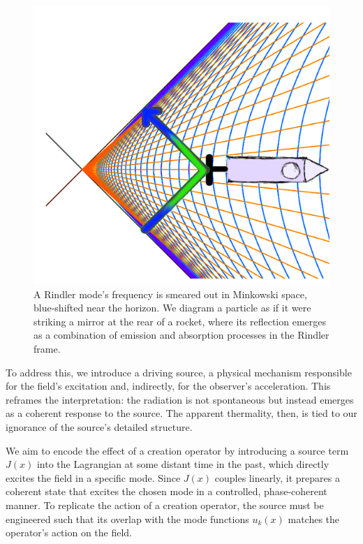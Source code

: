 \documentclass[12pt,a4paper]{article}
\begin{document}
\begin{figure}[h]
\centering
\includegraphics[scale=1.5]{emit_absorb.png}
\captionsetup{width=0.7\textwidth}
\caption{
  A Rindler mode's frequency is smeared out in Minkowski space, blue-shifted near the horizon. We diagram a particle as if it were striking a mirror at the rear of a rocket, where its reflection emerges as a combination of emission and absorption processes in the Rindler frame.}
\label{emit_absorb}
\end{figure}

To address this, we introduce a driving source, a physical mechanism responsible for the field's excitation and, indirectly, for the observer's acceleration. This reframes the interpretation: the radiation is not spontaneous but instead emerges as a coherent response to the source. The apparent thermality, then, is tied to our ignorance of the source's detailed structure.

We aim to encode the effect of a creation operator by introducing a source term $J(x)$ into the Lagrangian at some distant time in the past, which directly excites the field in a specific mode. Since $J(x)$ couples linearly, it prepares a coherent state that excites the chosen mode in a controlled, phase-coherent manner. To replicate the action of a creation operator, the source must be engineered such that its overlap with the mode functions $u_k(x)$ matches the operator’s action on the field.
\end{document}
